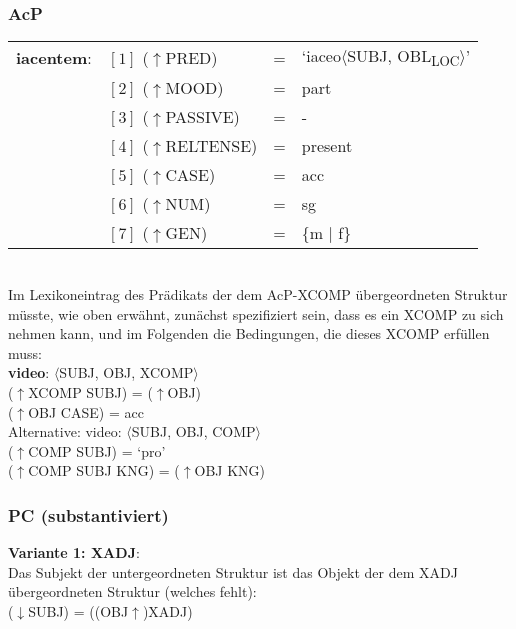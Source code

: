 \documentclass[12pt,a4paper]{article}
\begin{document}
\subsubsection{AcP}

\begin{singlespace}
\begin{tabular}{ l  l  l  l  } 
\textbf{iacentem}: & $[1]$ \: ($\uparrow$PRED) & = & `iaceo$\langle$SUBJ, OBL\textsubscript{LOC}$\rangle$'\\
$\qquad$ & $[2]$ \: ($\uparrow$MOOD) & = & part\\
$\qquad$ & $[3]$ \: ($\uparrow$PASSIVE) & = & - \\
$\qquad$ & $[4]$ \: ($\uparrow$RELTENSE) & = & present \\
$\qquad$ & $[5]$ \: ($\uparrow$CASE) & = & acc \\
$\qquad$ & $[6]$ \: ($\uparrow$NUM) & = & sg \\
$\qquad$ & $[7]$ \: ($\uparrow$GEN) & = & \{m $\mid$ f\} \\
\end{tabular}\\
\newline
Im Lexikoneintrag des Prädikats der dem AcP-XCOMP übergeordneten Struktur müsste, wie oben erwähnt, zunächst spezifiziert sein, dass es ein XCOMP zu sich nehmen kann, und im Folgenden die Bedingungen, die dieses XCOMP erfüllen muss:\\
\textbf{video}: $\langle$SUBJ, OBJ, XCOMP$\rangle$\\
($\uparrow$XCOMP SUBJ) = ($\uparrow$OBJ)\\
($\uparrow$OBJ CASE) = acc\\

Alternative:
video: $\langle$SUBJ, OBJ, COMP$\rangle$\\
($\uparrow$COMP SUBJ) = `pro'\\
($\uparrow$COMP SUBJ KNG) = ($\uparrow$OBJ KNG)\\

\end{singlespace}

\subsubsection{PC (substantiviert)}
\textbf{Variante 1: XADJ}:\\
Das Subjekt der untergeordneten Struktur ist das Objekt der dem XADJ übergeordneten Struktur (welches fehlt): \\
($\downarrow$SUBJ) = ((OBJ$\uparrow$)XADJ)
\end{document}
